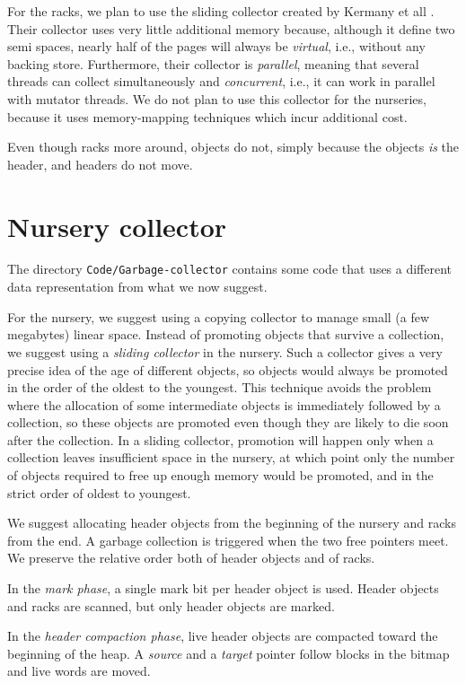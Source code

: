 For the racks, we plan to use the sliding collector created by Kermany
et all \cite{Kermany:2006:CCI:1133981.1134023}.  Their collector uses
very little additional memory because, although it define two semi
spaces, nearly half of the pages will always be \emph{virtual}, i.e.,
without any backing store.  Furthermore, their collector is
\emph{parallel}, meaning that several threads can collect
simultaneously and \emph{concurrent}, i.e., it can work in parallel
with mutator threads.  We do not plan to use this collector for the
nurseries, because it uses memory-mapping techniques which incur
additional cost.

Even though racks more around, objects do not, simply because the
objects \emph{is} the header, and headers do not move.  

\section{Nursery collector}
The directory \texttt{Code/Garbage-collector} contains some code that
uses a different data representation from what we now suggest.  

For the nursery, we suggest using a copying collector to manage small
(a few megabytes) linear space.  Instead of promoting objects that
survive a collection, we suggest using a \emph{sliding collector} in
the nursery.  Such a collector gives a very precise idea of the age of
different objects, so objects would always be promoted in the order of
the oldest to the youngest.  This technique avoids the problem where
the allocation of some intermediate objects is immediately followed by
a collection, so these objects are promoted even though they are
likely to die soon after the collection.  In a sliding collector,
promotion will happen only when a collection leaves insufficient space
in the nursery, at which point only the number of objects required to
free up enough memory would be promoted, and in the strict order of
oldest to youngest.

We suggest allocating header objects from the beginning of the nursery
and racks from the end.  A garbage collection is triggered
when the two free pointers meet.  We preserve the relative order both
of header objects and of racks. 

In the \emph{mark phase}, a single mark bit per header object is
used.  Header objects and racks are scanned, but only
header objects are marked.  

In the \emph{header compaction phase}, live header objects are compacted
toward the beginning of the heap.  A \emph{source} and a \emph{target}
pointer follow blocks in the bitmap and live words are moved. 

